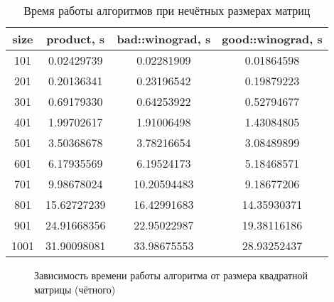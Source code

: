 \begin{table}
	\begin{center}
		\begin{tabular}{|c|c|c|c|}
			\hline
			size&          product, s&    bad::winograd, s&   good::winograd, s\\
			\hline
			 101&          0.02429739&          0.02281909&          0.01864598\\
			 \hline
			 201&          0.20136341&          0.23196542&          0.19879223\\
			 \hline
			 301&          0.69179330&          0.64253922&          0.52794677\\
			 \hline
			 401&          1.99702617&          1.91006498&          1.43084805\\
			 \hline
			 501&          3.50368678&          3.78216654&          3.08489899\\
			 \hline
			 601&          6.17935569&          6.19524173&          5.18468571\\
			 \hline
			 701&          9.98678024&         10.20594483&          9.18677206\\
			 \hline
			 801&         15.62727239&         16.42991683&         14.35930371\\
			 \hline
			 901&         24.91668356&         22.95022987&         19.38116186\\
			 \hline
			1001&         31.90098081&         33.98675553&         28.93252437\\
			\hline
		\end{tabular}
	\end{center}
	\caption{Время работы алгоритмов при нечётных размерах матриц}
	\label{tbl:runtime_odd}
\end{table}

\begin{figure}
	\centering
	\captionsetup{justification=centering}
	\caption{Зависимость времени работы алгоритма от размера квадратной матрицы (чётного)}
	\label{plt:runtime_even}
\end{figure}

